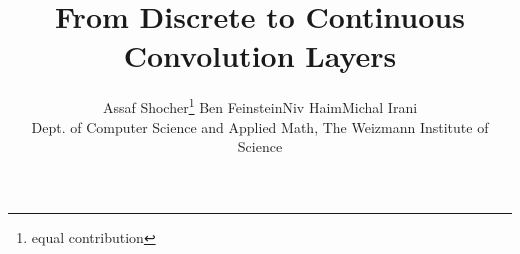 \documentclass{article}
\title{From Discrete to Continuous Convolution Layers}
\begin{document}
\author{Assaf Shocher\thanks{equal contribution}
\qquad Ben Feinstein\footnotemark[1]
\qquad Niv Haim\footnotemark[1]
\qquad Michal Irani\\
\small 
Dept. of Computer Science and Applied Math, The Weizmann Institute of Science
}

\maketitle







% 

\clearpage
\printbibliography

\clearpage

\end{document}
